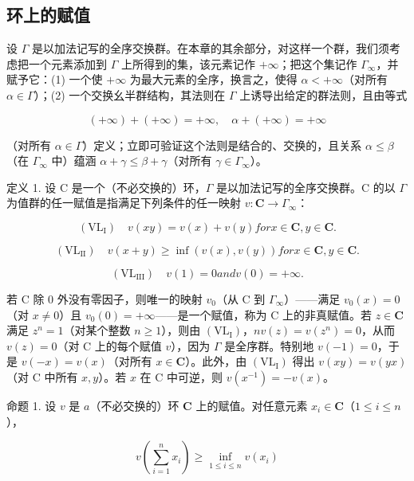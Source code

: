 \subsection{环上的赋值}

设 \(\Gamma\) 是以加法记写的全序交换群。在本章的其余部分，对这样一个群，我们须考虑把一个元素添加到 \(\Gamma\) 上所得到的集，该元素记作 \(+\infty\)；把这个集记作 \(\Gamma_{\infty}\)，并赋予它：(1) 一个使 \(+\infty\) 为最大元素的全序，换言之，使得 \(\alpha < +\infty\)（对所有 \(\alpha \in \Gamma\)）；(2) 一个交换幺半群结构，其法则在 \(\Gamma\) 上诱导出给定的群法则，且由等式

\[
(+ \infty) + (+ \infty) = + \infty , \quad \alpha + (+ \infty) = + \infty
\]

（对所有 \(\alpha \in \Gamma\)）定义；立即可验证这个法则是结合的、交换的，且关系 \(\alpha \leqslant \beta\)（在 \(\Gamma_{\infty}\) 中）蕴涵 \(\alpha + \gamma \leqslant \beta + \gamma\)（对所有 \(\gamma \in \Gamma_{\infty}\)）。

定义 1. 设 C 是一个（不必交换的）环，\(\Gamma\) 是以加法记写的全序交换群。C 的以 \(\Gamma\) 为值群的任一赋值是指满足下列条件的任一映射 \(v: \mathbf{C} \to \Gamma_{\infty}\)：

\[
(\mathrm{VL}_{\mathrm{I}}) \quad v (x y) = v (x) + v (y) for x \in \mathbf {C}, y \in \mathbf {C}.
\]

\[
(\mathrm{VL}_{\mathrm{II}}) \quad v (x + y) \geqslant \inf (v (x), v (y)) for x \in \mathbf {C}, y \in \mathbf {C}.
\]

\[
(\mathrm{VL} _ {\mathrm{III}}) \quad v (1) = 0 and v (0) = + \infty .
\]

若 C 除 0 外没有零因子，则唯一的映射 \(v_0\)（从 C 到 \(\Gamma_\infty\)）——满足 \(v_0(x) = 0\)（对 \(x \neq 0\)）且 \(v_0(0) = +\infty\)——是一个赋值，称为 C 上的非真赋值。若 \(z \in \mathbf{C}\) 满足 \(z^n = 1\)（对某个整数 \(n \geqslant 1\)），则由 \((\mathrm{VL}_{\mathrm{I}})\)，\(nv(z) = v(z^n) = 0\)，从而 \(v(z) = 0\)（对 C 上的每个赋值 \(v\)），因为 \(\Gamma\) 是全序群。特别地 \(v(-1) = 0\)，于是 \(v(-x) = v(x)\)（对所有 \(x \in \mathbf{C}\)）。此外，由 \((\mathrm{VL}_{\mathrm{I}})\) 得出 \(v(xy) = v(yx)\)（对 C 中所有 \(x, y\)）。若 \(x\) 在 C 中可逆，则 \(v(x^{-1}) = -v(x)\)。

命题 1. 设 \(v\) 是 \(a\)（不必交换的）环 \(\mathbf{C}\) 上的赋值。对任意元素 \(x_{i} \in \mathbf{C}\)（\(1 \leqslant i \leqslant n\)），

\[
v \left(\sum_ {i = 1} ^ {n} x _ {i}\right) \geqslant \inf _ {1 \leqslant i \leqslant n} v (x _ {i})\tag{1}
\]

